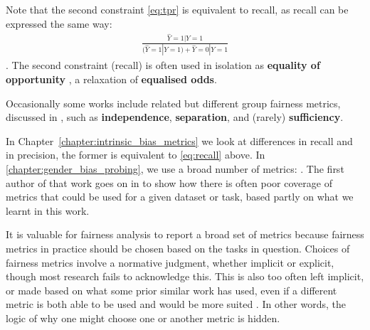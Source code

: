 Note that the second constraint \ref{eq:tpr} is equivalent to recall, as recall can be expressed the same way:
\begin{align}\label{eq:recall}
    \frac{\hat{Y} = 1 | Y=1}{(\hat{Y} = 1 | Y=1) + \hat{Y} = 0 | Y=1}
\end{align}.
The second constraint (recall) is often used in isolation as \textbf{equality of opportunity} \citep{hardt2016equality}, a relaxation of \textbf{equalised odds}. 

Occasionally some works include related but different group fairness metrics, discussed in \citet{barocas-hardt-narayanan}, such as \textbf{independence}, \textbf{separation}, and (rarely) \textbf{sufficiency}. 



In Chapter~\ref{chapter:intrinsic_bias_metrics} we look at differences in recall and in precision, the former is equivalent to \ref{eq:recall} above. In \ref{chapter:gender_bias_probing}, we use a broad number of metrics: . The first author of that work goes on in \citet{orgad-belinkov-2022-choose} to show how there is often poor coverage of metrics that could be used for a given dataset or task, based partly on what we learnt in this work. 

It is valuable for fairness analysis to report a broad set of metrics because fairness metrics in practice should be chosen based on the tasks in question. 
Choices of fairness metrics involve a normative judgment, whether implicit or explicit, though most research fails to acknowledge this. This is also too often left implicit, or made based on what some prior similar work has used, even if a different metric is both able to be used and would be more suited \citep{orgad-belinkov-2022-choose}. In other words, the logic of why one might choose one or another metric is hidden. 

